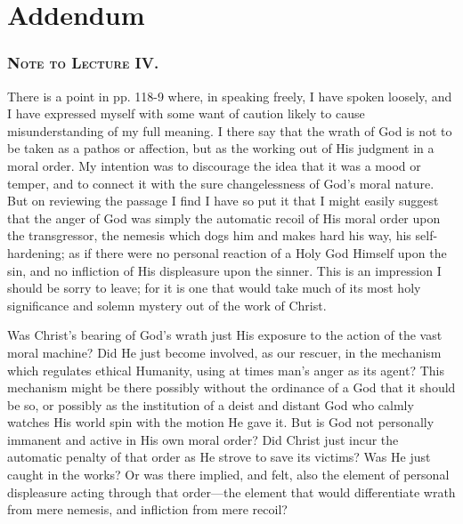 \documentclass[draft]{ptfdoc}
\begin{document}
\backmatter

\chapter{Addendum} 



\subsection*{
\textsc{Note to Lecture IV.} 
}

There is a point in pp. 118-9 where, in speaking freely, 
I have spoken loosely, and I have expressed myself with 
some want of caution likely to cause misunderstanding 
of my full meaning. I there say that the wrath of God 
is not to be taken as a pathos or affection, but as the 
working out of His judgment in a moral order. My 
intention was to discourage the idea that it was a 
mood or temper, and to connect it with the sure changelessness 
of God's moral nature. But on reviewing the 
passage I find I have so put it that I might easily suggest 
that the anger of God was simply the automatic recoil 
of His moral order upon the transgressor, the nemesis 
which dogs him and makes hard his way, his self-hardening; 
as if there were no personal reaction of a Holy God 
Himself upon the sin, and no infliction of His displeasure 
upon the sinner. This is an impression I should be sorry 
to leave; for it is one that would take much of its most 
holy significance and solemn mystery out of the work of 
Christ. 

Was Christ's bearing of God's wrath just His exposure 
to the action of the vast moral machine? Did He just 
become involved, as our rescuer, in the mechanism which 
regulates ethical Humanity, using at times man's anger as 
its agent? This mechanism might be there possibly without 
the ordinance of a God that it should be so, or possibly 
as the institution of a deist and distant God who calmly 
watches His world spin with the motion He gave it. But 
is God not personally immanent and active in His own 
moral order? Did Christ just incur the automatic penalty 
of that order as He strove to save its victims? Was He 
just caught in the works? Or was there implied, and 
felt, also the element of personal displeasure acting 
through that order---the element that would differentiate 
wrath from mere nemesis, and infliction from mere recoil? 
\end{document}

